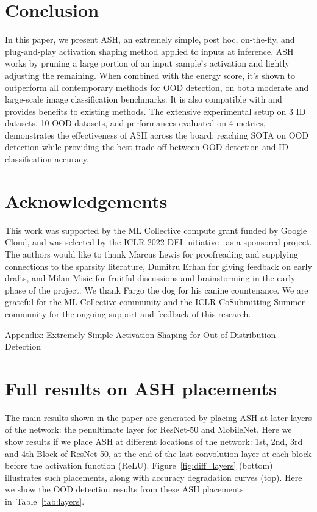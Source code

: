 \documentclass{article}
\newcommand{\figref}[1]{Figure~\ref{fig:#1}}
\newcommand{\seclabel}[1]{\label{sec:#1}}
\newcommand{\tabref}[1]{Table~\ref{tab:#1}}
\begin{document}
\section{Conclusion}
In this paper, we present ASH, an extremely simple, post hoc, on-the-fly, and plug-and-play activation shaping method applied to inputs at inference. ASH works by pruning a large portion of an input sample’s activation and lightly adjusting the remaining. When combined with the energy score, it's shown to outperform all contemporary methods for OOD detection, on both moderate and large-scale image classification benchmarks. It is also compatible with and provides benefits to existing methods. The extensive experimental setup on 3 ID datasets, 10 OOD datasets, and performances evaluated on 4 metrics, demonstrates the effectiveness of ASH across the board: reaching SOTA on OOD detection while providing the best trade-off between OOD detection and ID classification accuracy. 




\section*{Acknowledgements} 
This work was supported by the ML Collective compute grant funded by Google Cloud, and was selected by the ICLR 2022 DEI initiative~\citep{CSS1, CSS2} as a sponsored project.
The authors would like to thank Marcus Lewis for proofreading and supplying connections to the sparsity literature, Dumitru Erhan for giving feedback on early drafts, and Milan Misic for fruitful discussions and brainstorming in the early phase of the project. We thank Fargo the dog for his canine countenance.
We are grateful for the ML Collective community and the ICLR CoSubmitting Summer community for the ongoing support and feedback of this research.





\newpage
\appendix






\begin{center}

\LARGE \sc Appendix: Extremely Simple Activation Shaping for Out-of-Distribution Detection

\end{center}

\section{Full results on ASH placements}
\seclabel{appendix_ash_placement}
The main results shown in the paper are generated by placing ASH at later layers of the network: the penultimate layer for ResNet-50 and MobileNet. Here we show results if we place ASH at different locations of the network: 1st, 2nd, 3rd and 4th Block of ResNet-50, at the end of the last convolution layer at each block before the activation function (ReLU). \figref{diff_layers} (bottom) illustrates such placements, along with accuracy degradation curves (top). Here we show the OOD detection results from these ASH placements in~\tabref{layers}.
\end{document}
